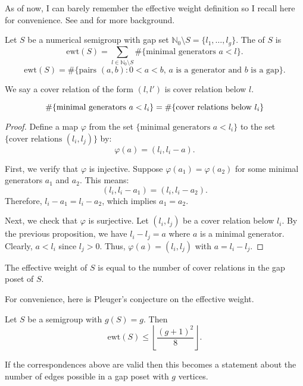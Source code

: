 As of now, I can barely remember the effective weight definition so I recall here for convenience. See \cite{Pflueger_2018} and \cite{kaplan2019families} for more background.

\begin{definition}
        Let \( S \) be a numerical semigroup with gap set \( \mathbb{N}_0 \setminus S = \{ l_1, \ldots, l_g \} \).
    The  of \( S \) is
    \[
    \text{ewt}(S) = \sum_{l \in \mathbb{N}_0 \setminus S} \# \{ \text{minimal generators } a < l \}.
    \]
    \[
    \text{ewt}(S) = \# \{ \text{pairs } (a, b) : 0 < a < b, \, a \text{ is a generator and } b \text{ is a gap} \}.
    \]
\end{definition}

We say a cover relation of the form \((l, l')\) is cover relation below \(l\).

\begin{proposition}
\[\# \{ \text{minimal generators } a < l_i \} = \# \{\text{cover relations below \( l_i \)}\}\]
\end{proposition}

\begin{proof}
Define a map \(\varphi\) from the set \(\{\text{minimal generators } a < l_i\}\) to the set \(\{\text{cover relations } (l_i, l_j)\}\) by:
\[
\varphi(a) = (l_i, l_i - a).
\]

First, we verify that \(\varphi\) is injective. Suppose \(\varphi(a_1) = \varphi(a_2)\) for some minimal generators \(a_1\) and \(a_2\). This means:
\[
(l_i, l_i - a_1) = (l_i, l_i - a_2).
\]
Therefore, \(l_i - a_1 = l_i - a_2\), which implies \(a_1 = a_2\).

Next, we check that \(\varphi\) is surjective. Let \((l_i, l_j)\) be a cover relation below \( l_i \). By the previous proposition, we have \(l_i - l_j = a\) where \(a\) is a minimal generator. Clearly, \(a < l_i\) since \(l_j > 0\). Thus, \(\varphi(a) = (l_i, l_j)\) with \(a = l_i - l_j\).
\end{proof}

\begin{corollary}
The effective weight of \(S\) is equal to the number of cover relations in the gap poset of \(S\).
\end{corollary}

For convenience, here is Pleuger's conjecture on the effective weight.

\begin{conjecture}
    Let \( S \) be a semigroup with \( g(S) = g \). Then
    \[
    \text{ewt}(S) \leq \left\lfloor \frac{(g + 1)^2}{8} \right\rfloor.
    \]
\end{conjecture}

If the correspondences above are valid then this becomes a statement about the number of edges possible in a gap poset with \(g\) vertices.
